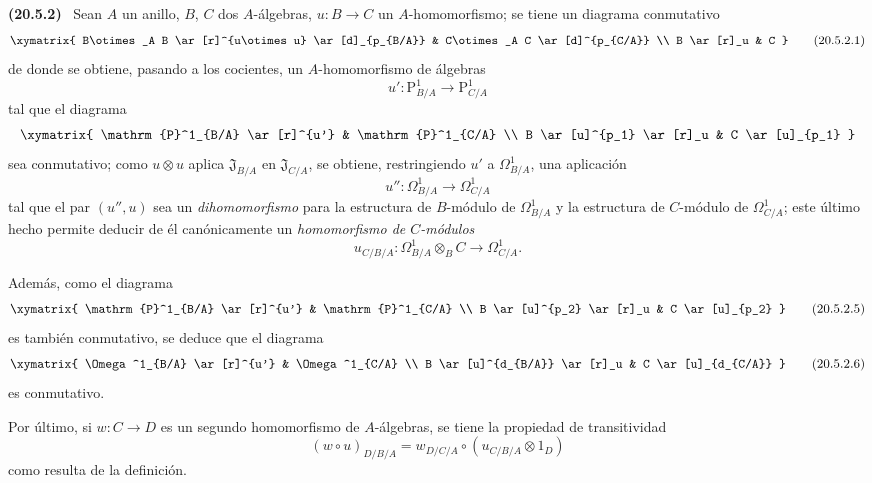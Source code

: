 \documentclass[10pt,oneside]{book}
\makeatletter
\newcommand{\setmanualcurrentlabel}[1]{\def\@currentlabel{#1}}
\newcommand{\oldpage}[2][]{%
  \setcounter{footnote}{0}%
  \marginpar{\scriptsize\textbf{#1}~|~#2}\ignorespaces}
\newenvironment{env}[1][]{\setmanualcurrentlabel{#1}\par\medskip\noindent\textbf{(#1)}\ }{\par}
\makeatother
\begin{document}
\begin{env}[20.5.2]
\label{0.20.5.2-es}
Sean $A$ un anillo, $B$, $C$ dos $A$-álgebras, $u:B\to C$ un
$A$-homomorfismo; se tiene un diagrama conmutativo
\[
\xymatrix{
  B\otimes_A B \ar[r]^{u\otimes u} \ar[d]_{p_{B/A}} &
  C\otimes_A C \ar[d]^{p_{C/A}} \\
  B \ar[r]_u & C
}
\tag{20.5.2.1}
\label{0.20.5.2.1-es}
\]
de donde se obtiene, pasando a los cocientes, un $A$-homomorfismo de álgebras
\begin{equation}
\tag{20.5.2.2}
\label{0.20.5.2.2-es}
  u':\mathrm{P}^1_{B/A}\to\mathrm{P}^1_{C/A}
\end{equation}
tal que el diagrama
\[
\xymatrix{
  \mathrm{P}^1_{B/A} \ar[r]^{u'} & \mathrm{P}^1_{C/A} \\
  B \ar[u]^{p_1} \ar[r]_u & C \ar[u]_{p_1}
}
\]
sea conmutativo; como $u\otimes u$ aplica $\mathfrak{J}_{B/A}$ en
$\mathfrak{J}_{C/A}$, se obtiene, restringiendo $u'$ a
$\Omega^1_{B/A}$, una aplicación
\begin{equation}
\tag{20.5.2.3}
\label{0.20.5.2.3-es}
  u'':\Omega^1_{B/A}\to\Omega^1_{C/A}
\end{equation}
tal que el par $(u'',u)$ sea un \emph{dihomomorfismo} para la
estructura de $B$-módulo de $\Omega^1_{B/A}$ y la estructura de $C$-módulo de
$\Omega^1_{C/A}$; este último hecho permite deducir de él canónicamente un
\emph{homomorfismo de $C$-módulos}
\begin{equation}
\tag{20.5.2.4}
\label{0.20.5.2.4-es}
  u_{C/B/A}:\Omega^1_{B/A}\otimes_B C\to\Omega^1_{C/A}.
\end{equation}

\oldpage[0\textsubscript{IV-1}]{129}
Además, como el diagrama
\[
\xymatrix{
  \mathrm{P}^1_{B/A} \ar[r]^{u'} & \mathrm{P}^1_{C/A} \\
  B \ar[u]^{p_2} \ar[r]_u & C \ar[u]_{p_2}
}
\tag{20.5.2.5}
\label{0.20.5.2.5-es}
\]
es también conmutativo, se deduce que el diagrama
\[
\xymatrix{
  \Omega^1_{B/A} \ar[r]^{u'} & \Omega^1_{C/A} \\
  B \ar[u]^{d_{B/A}} \ar[r]_u & C \ar[u]_{d_{C/A}}
}
\tag{20.5.2.6}
\label{0.20.5.2.6-es}
\]
es conmutativo.

Por último, si $w:C\to D$ es un segundo homomorfismo de $A$-álgebras, se tiene la
propiedad de transitividad
\begin{equation}
\tag{20.5.2.7}
\label{0.20.5.2.7-es}
  (w\circ u)_{D/B/A}
  =w_{D/C/A}\circ(u_{C/B/A}\otimes1_D)
\end{equation}
como resulta de la definición.
\end{env}
\end{document}
